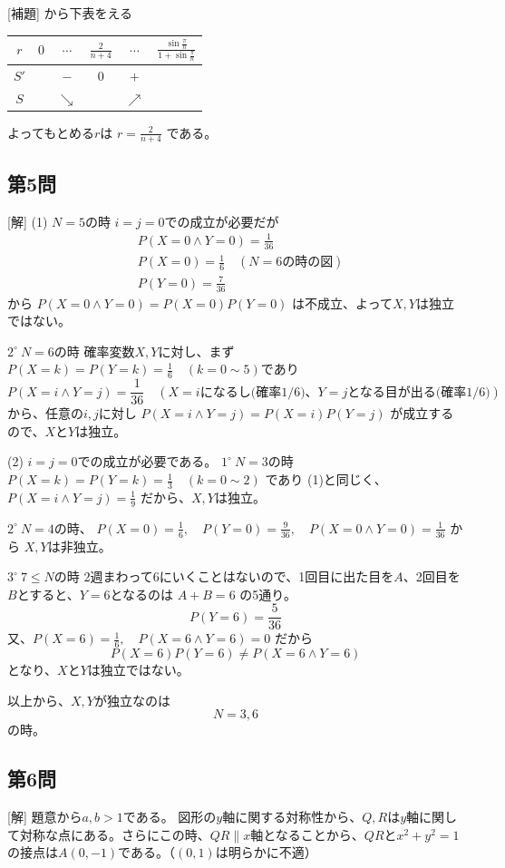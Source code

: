 \documentclass[../main.tex]{subfiles}
\begin{document}
[補題] から下表をえる
\begin{center}
  \begin{tabular}{|c|c|c|c|c|c|}
    \hline
    $r$ & $0$ & $\cdots$ & $\frac{2}{n+4}$ & $\cdots$ & $\frac{\sin \frac{\pi}{n}}{1+\sin \frac{\pi}{n}}$ \\
    \hline
    $S'$ & & $-$ & $0$ & $+$ & \\
    \hline
    $S$ & & $\searrow$ & & $\nearrow$ & \\
    \hline
  \end{tabular}
\end{center}
よってもとめる$r$は $r = \frac{2}{n+4}$ である。

\subsection*{第5問}
[解]
(1) $N=5$の時
$i=j=0$での成立が必要だが
\begin{align*}
  &P(X=0 \land Y=0) = \frac{1}{36} \\
  &P(X=0) = \frac{1}{6} \quad (N=6\text{の時の図}) \\
  &P(Y=0) = \frac{7}{36}
\end{align*}
から $P(X=0 \land Y=0) = P(X=0)P(Y=0)$ は不成立、よって$X, Y$は独立ではない。

$2^{\circ} \ N=6$の時
確率変数$X, Y$に対し、まず$P(X=k)=P(Y=k)=\frac{1}{6} \quad (k=0 \sim 5)$であり
$$ P(X=i \land Y=j) = \frac{1}{36} \quad \left( \text{$X=i$になるし(確率$1/6$)、$Y=j$となる目が出る(確率$1/6$)} \right) $$
から、任意の$i, j$に対し $P(X=i \land Y=j) = P(X=i)P(Y=j)$ が成立するので、$X$と$Y$は独立。

(2) $i=j=0$での成立が必要である。
$1^{\circ} \ N=3$の時
$P(X=k)=P(Y=k)=\frac{1}{3} \quad (k=0 \sim 2)$ であり (1)と同じく、
$P(X=i \land Y=j) = \frac{1}{9}$ だから、$X, Y$は独立。

$2^{\circ} \ N=4$の時、
$P(X=0) = \frac{1}{6}, \quad P(Y=0) = \frac{9}{36}, \quad P(X=0 \land Y=0) = \frac{1}{36}$ から
$X, Y$は非独立。

$3^{\circ} \ 7 \le N$の時
2週まわって6にいくことはないので、1回目に出た目を$A$、2回目を$B$とすると、$Y=6$となるのは $A+B=6$ の5通り。
$$ P(Y=6) = \frac{5}{36} $$
又、$P(X=6)=\frac{1}{6}, \quad P(X=6 \land Y=6)=0$ だから
$$ P(X=6)P(Y=6) \neq P(X=6 \land Y=6) $$
となり、$X$と$Y$は独立ではない。

以上から、$X, Y$が独立なのは
$$ N=3, 6 $$
の時。

\subsection*{第6問}
[解] 題意から$a, b > 1$である。
図形の$y$軸に関する対称性から、$Q, R$は$y$軸に関して対称な点にある。さらにこの時、$QR \parallel x$軸となることから、$QR$と$x^2+y^2=1$の接点は$A(0, -1)$である。（$(0, 1)$は明らかに不適）
\end{document}
